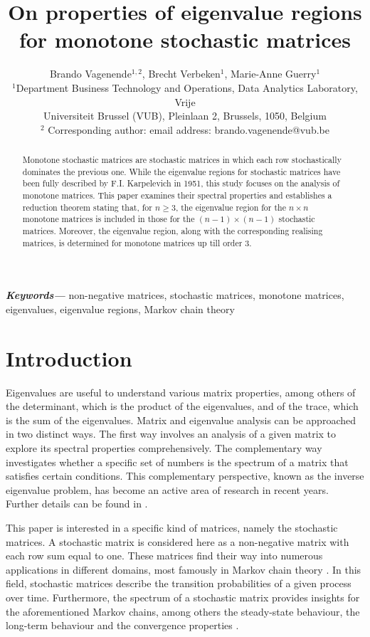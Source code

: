 \documentclass[11pt,a4paper]{article}
\title{On properties of eigenvalue regions for monotone stochastic matrices}
\date{}
\author{Brando Vagenende$^{1,2}$, Brecht Verbeken$^{1}$, Marie-Anne Guerry$^{1}$  \\  
        \small $^{1}$Department Business Technology and Operations, Data Analytics Laboratory, Vrije \\
        \small Universiteit Brussel (VUB), Pleinlaan 2, Brussels, 1050, Belgium \\
        \small $^{2}$ Corresponding author: email address: brando.vagenende@vub.be
}
\theoremstyle{definition}
\theoremstyle{remark}
\providecommand{\keywords}[1]
{
  \small	
  \textbf{\textit{Keywords---}} #1
}
\begin{document}
\maketitle

\begin{abstract}
Monotone stochastic matrices are stochastic matrices in which each row stochastically dominates the previous one. While the eigenvalue regions for stochastic matrices have been fully described by F.I. Karpelevich in 1951, this study focuses on the analysis of monotone matrices. This paper examines their spectral properties and establishes a reduction theorem stating that, for \(n \geq 3\), the eigenvalue region for the \(n \times n\) monotone matrices is included in those for the \((n-1)\times(n-1)\) stochastic matrices. Moreover, the eigenvalue region, along with the corresponding realising matrices, is determined for monotone matrices up till order \(3\).
\end{abstract}

\keywords{non-negative matrices, stochastic matrices, monotone matrices, eigenvalues, eigenvalue regions, Markov chain theory}

\section{Introduction}
 Eigenvalues are useful to understand various matrix properties, among others of the determinant, which is the product of the eigenvalues, and of the trace, which is the sum of the eigenvalues. Matrix and eigenvalue analysis can be approached in two distinct ways. The first way involves an analysis of a given matrix to explore its spectral properties comprehensively. The complementary way investigates whether a specific set of numbers is the spectrum of a matrix that satisfies certain conditions. This complementary perspective, known as the inverse eigenvalue problem, has become an active area of research in recent years. Further details can be found in \cite{chu1998inverse, paparella2019realizing}.

This paper is interested in a specific kind of matrices, namely the stochastic matrices. A stochastic matrix is considered here as a non-negative matrix with each row sum equal to one. These matrices find their way into numerous applications in different domains, most famously in Markov chain theory \cite{Bartholomew}. In this field, stochastic matrices describe the transition probabilities of a given process over time. Furthermore, the spectrum of a stochastic matrix provides insights for the aforementioned Markov chains, among others the steady-state behaviour, the long-term behaviour and the convergence 
properties \cite{pillai2005perron, delbianco2023markov, racoceanu1995new, meyer2000applied}.
\end{document}
